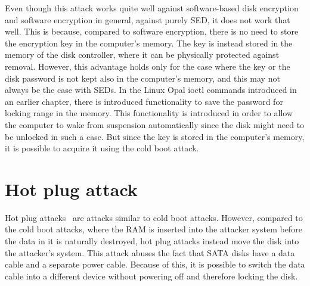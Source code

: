 Even though this attack works quite well against software-based disk encryption and software encryption in general, against purely SED, it does not work that well. This is because, compared to software encryption, there is no need to store the encryption key in the computer's memory. The key is instead stored in the memory of the disk controller, where it can be physically protected against removal.
However, this advantage holds only for the case where the key or the disk password is not kept also in the computer's memory, and this may not always be the case with SEDs. In the Linux Opal ioctl commands introduced in an earlier chapter, there is introduced functionality to save the password for locking range in the memory. This functionality is introduced in order to allow the computer to wake from suspension automatically since the disk might need to be unlocked in such a case. But since the key is stored in the computer's memory, it is possible to acquire it using the cold boot attack.

\section{Hot plug attack}

Hot plug attacks~\cite{self_decrypting_risks} are attacks similar to cold boot attacks. However, compared to the cold boot attacks, where the RAM is inserted into the attacker system before the data in it is naturally destroyed, hot plug attacks instead move the disk into the attacker's system. This attack abuses the fact that SATA disks have a data cable and a separate power cable. Because of this, it is possible to switch the data cable into a different device without powering off and therefore locking the disk.


